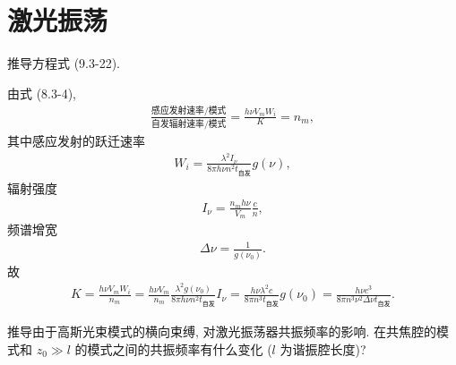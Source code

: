 \documentclass{note}
\begin{document}
\fi
\setcounter{chapter}{8}
\chapter{激光振荡}
\begin{exe}
    推导方程式 (9.3-22).
\end{exe}
\begin{pf}
    由式 (8.3-4),
    \begin{align}
        \frac{\text{感应发射速率}/\text{模式}}{\text{自发辐射速率}/\text{模式}}=\frac{h\nu V_mW_i}{K}=n_m,
    \end{align}
    其中感应发射的跃迁速率
    \begin{align}
        W_i=\frac{\lambda^2I_{\nu}}{8\pi h\nu n^2t_{\text{自发}}}g(\nu),
    \end{align}
    辐射强度
    \begin{align}
        I_{\nu}=\frac{n_mh\nu}{V_m}\frac{c}{n},
    \end{align}
    频谱增宽
    \begin{align}
        \Delta\nu=\frac{1}{g(\nu_0)}.
    \end{align}
    故
    \begin{align}
        K=\frac{h\nu V_mW_i}{n_m}=\frac{h\nu V_m}{n_m}\frac{\lambda^2g(\nu_0)}{8\pi h\nu n^2t_{\text{自发}}}I_{\nu}=\frac{h\nu\lambda^2c}{8\pi n^3t_{\text{自发}}}g(\nu_0)=\frac{h\nu c^3}{8\pi n^3\nu^2\Delta\nu t_{\text{自发}}}.
    \end{align}
\end{pf}

\begin{exe}
    推导由于高斯光束模式的横向束缚, 对激光振荡器共振频率的影响. 在共焦腔的模式和 $z_0\gg l$ 的模式之间的共振频率有什么变化 ($l$ 为谐振腔长度)?
\end{exe}
\begin{pf}
    
\end{pf}
\end{document}
